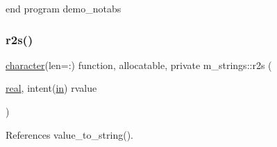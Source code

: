 end program demo\+\_\+notabs \mbox{\label{namespacem__strings_a5adef1b5667afe21e0ee21cfdba13b45}} 
\subsubsection{\texorpdfstring{r2s()}{r2s()}}
{\footnotesize\ttfamily \hyperlink{option__stopwatch_83_8txt_abd4b21fbbd175834027b5224bfe97e66}{character}(len=\+:) function, allocatable, private m\+\_\+strings\+::r2s (\begin{DoxyParamCaption}\item[{\hyperlink{read__watch_83_8txt_abdb62bde002f38ef75f810d3a905a823}{real}, intent(\hyperlink{M__journal_83_8txt_afce72651d1eed785a2132bee863b2f38}{in})}]{rvalue }\end{DoxyParamCaption})\hspace{0.3cm}{\ttfamily [private]}}



References value\+\_\+to\+\_\+string().

\mbox{\label{namespacem__strings_a02d97675e95b9bd0ef3fd2abb9f2f435}} 
